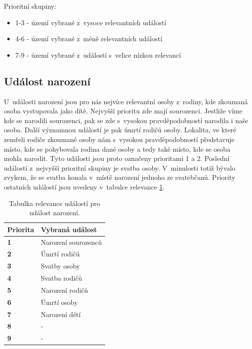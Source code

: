 Prioritní skupiny:
\begin{itemize}
	\item 1-3 - území vybrané z~vysoce relevantních událostí
	\item 4-6 - území vybrané z~méně relevantních událostí
	\item 7-9 - území vybrané z~událostí s~velice nízkou relevancí
\end{itemize}

\subsection{Událost narození}
U~události narození jsou pro nás nejvíce relevantní osoby z~rodiny, kde zkoumaná osoba vystupovala jako dítě. Nejvyšší prioritu zde mají sourozenci. Jestliže víme kde se narodili sourozenci, pak se zde s~vysokou pravděpodobností narodila i naše osoba. Další významnou událostí je pak úmrtí rodičů osoby. Lokalita, ve které zemřeli rodiče zkoumané osoby nám s~vysokou pravděpodobností představuje místo, kde se pohybovala rodina dané osoby a tedy také místo, kde se osoba mohla narodit. Tyto události jsou proto označeny prioritami 1 a 2. Poslední událostí z~nejvyšší prioritní skupiny je svatba osoby. V~minulosti totiž bývalo zvykem, že se svatba konala v~místě narození jednoho ze svatebčanů. Priority ostatních událostí jsou uvedeny v~tabulce relevance \ref{table_birth}.

\begin{table}[!ht]
	\label{table_birth}
	\centering
	\begin{tabular}{ll}
		\hline
		\textbf{Priorita} & \textbf{Vybraná událost} \\ \hline
		\rowcolor{tableGreen}
		\textbf{1} & Narození sourozenců \\ 
		\rowcolor{tableGreen}
		\textbf{2} & Úmrtí rodičů \\ 
		\rowcolor{tableGreen}
		\textbf{3} & Svatby osoby  \\ 
		\rowcolor{tableOrange}
		\textbf{4} & Svatba rodičů \\ 
		\rowcolor{tableOrange}
		\textbf{5} & Narození rodičů  \\ 
		\rowcolor{tableOrange}
		\textbf{6} & Úmrtí osoby \\ 
		\rowcolor{tableRed}
		\textbf{7} & Narození dětí \\ 
		\rowcolor{tableRed}
		\textbf{8} & - \\ 
		\rowcolor{tableRed}
		\textbf{9} & - \\ \hline
	\end{tabular}
	\caption{Tabulka relevance událostí pro událost narození.}
\end{table}

